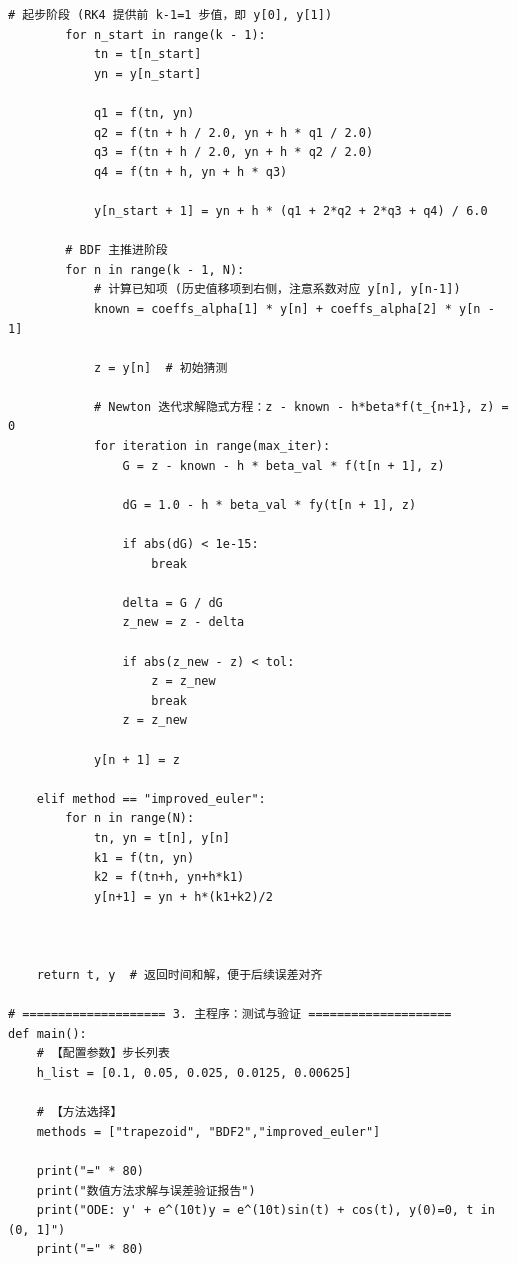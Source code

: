 \documentclass[UTF8,a4paper,11pt]{ctexart}                    %
\begin{document}
\begin{lstlisting}[style=python,caption={梯形方法、BDF2、改进Euler方法比较}]
        # 起步阶段 (RK4 提供前 k-1=1 步值，即 y[0], y[1])
        for n_start in range(k - 1):
            tn = t[n_start]
            yn = y[n_start]
            
            q1 = f(tn, yn)
            q2 = f(tn + h / 2.0, yn + h * q1 / 2.0)
            q3 = f(tn + h / 2.0, yn + h * q2 / 2.0)
            q4 = f(tn + h, yn + h * q3)
            
            y[n_start + 1] = yn + h * (q1 + 2*q2 + 2*q3 + q4) / 6.0

        # BDF 主推进阶段
        for n in range(k - 1, N):
            # 计算已知项 (历史值移项到右侧，注意系数对应 y[n], y[n-1])
            known = coeffs_alpha[1] * y[n] + coeffs_alpha[2] * y[n - 1]
            
            z = y[n]  # 初始猜测
            
            # Newton 迭代求解隐式方程：z - known - h*beta*f(t_{n+1}, z) = 0
            for iteration in range(max_iter):
                G = z - known - h * beta_val * f(t[n + 1], z)
                
                dG = 1.0 - h * beta_val * fy(t[n + 1], z)
                
                if abs(dG) < 1e-15:
                    break
                
                delta = G / dG
                z_new = z - delta
                
                if abs(z_new - z) < tol:
                    z = z_new
                    break
                z = z_new
            
            y[n + 1] = z
    
    elif method == "improved_euler":  
        for n in range(N):
            tn, yn = t[n], y[n]
            k1 = f(tn, yn)  
            k2 = f(tn+h, yn+h*k1) 
            y[n+1] = yn + h*(k1+k2)/2 



    return t, y  # 返回时间和解，便于后续误差对齐

# ==================== 3. 主程序：测试与验证 ====================
def main():
    # 【配置参数】步长列表
    h_list = [0.1, 0.05, 0.025, 0.0125, 0.00625]
    
    # 【方法选择】
    methods = ["trapezoid", "BDF2","improved_euler"]

    print("=" * 80)
    print("数值方法求解与误差验证报告")
    print("ODE: y' + e^(10t)y = e^(10t)sin(t) + cos(t), y(0)=0, t in (0, 1]")
    print("=" * 80)


\end{lstlisting}
\end{document}
